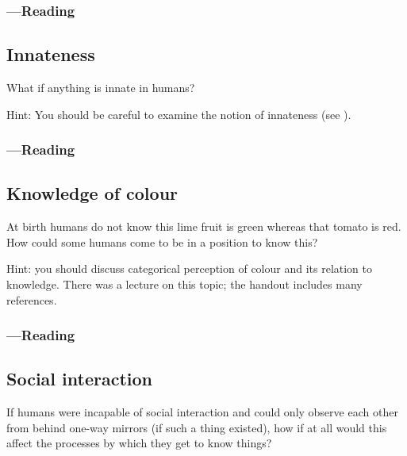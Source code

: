 \documentclass[12pt,\papersize]{extarticle}
\begin{document}
\subsubsection{---Reading}





\subsection{Innateness}
What if anything is innate in humans?

Hint: You should be careful to examine the notion of innateness  (see \citealp{Samuels:2004ho}).

\subsubsection{---Reading}





\subsection{Knowledge of colour}
At birth humans do not know this lime fruit is green whereas that tomato is red.
How could some humans come to be in a position to know this?

Hint: you should discuss categorical perception of colour and its relation to knowledge.  There was a lecture on this topic; the handout includes many references.

\subsubsection{---Reading}









\subsection{Social interaction}
If humans were incapable of social interaction and could only observe each other from behind one-way mirrors (if such a thing existed), how if at all would this affect the processes by which they get to know things?
\end{document}
